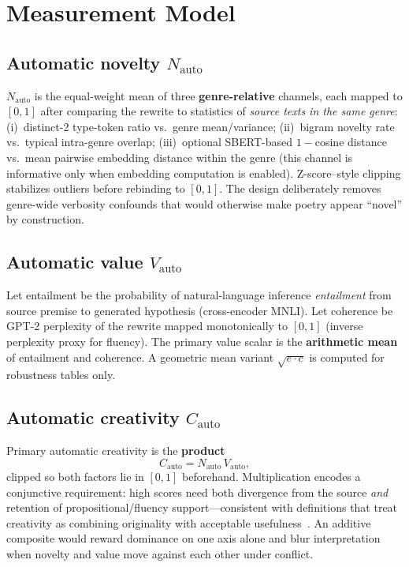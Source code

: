 \documentclass[sigconf,nonacm]{acmart}
\begin{document}
\section{Measurement Model}

\subsection{Automatic novelty $N_{\mathrm{auto}}$}

$N_{\mathrm{auto}}$ is the equal-weight mean of three \textbf{genre-relative} channels, each mapped to $[0,1]$ after comparing the rewrite to statistics of \emph{source texts in the same genre}: (i)~distinct-2 type-token ratio vs.\ genre mean/variance; (ii)~bigram novelty rate vs.\ typical intra-genre overlap; (iii)~optional SBERT-based $1{-}$cosine distance vs.\ mean pairwise embedding distance within the genre (this channel is informative only when embedding computation is enabled). Z-score--style clipping stabilizes outliers before rebinding to $[0,1]$. The design deliberately removes genre-wide verbosity confounds that would otherwise make poetry appear ``novel'' by construction.

\subsection{Automatic value $V_{\mathrm{auto}}$}

Let entailment be the probability of natural-language inference \emph{entailment} from source premise to generated hypothesis (cross-encoder MNLI). Let coherence be GPT-2 perplexity of the rewrite mapped monotonically to $[0,1]$ (inverse perplexity proxy for fluency). The primary value scalar is the \textbf{arithmetic mean} of entailment and coherence. A geometric mean variant $\sqrt{e\cdot c}$ is computed for robustness tables only.

\subsection{Automatic creativity $C_{\mathrm{auto}}$}

Primary automatic creativity is the \textbf{product}
\[
  C_{\mathrm{auto}} = N_{\mathrm{auto}}\, V_{\mathrm{auto}},
\]
clipped so both factors lie in $[0,1]$ beforehand. Multiplication encodes a conjunctive requirement: high scores need both divergence from the source \emph{and} retention of propositional/fluency support---consistent with definitions that treat creativity as combining originality with acceptable usefulness~\cite{runco}. An additive composite would reward dominance on one axis alone and blur interpretation when novelty and value move against each other under conflict.
\end{document}
